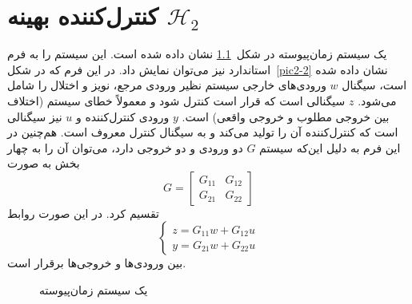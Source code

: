 \chapter{کنترل‌کننده بهینه $\mathcal{H}_2$}

\newcommand{\norm}[1]{\lVert#1\lVert}


یک سیستم زمان‌پیوسته در شکل~\ref{pic2-1} نشان داده شده است. این سیستم را به فرم استاندارد نیز می‌توان نمایش داد. در این فرم که در شکل~\ref{pic2-2} نشان داده شده است، سیگنال $w$ ورودی‌های خارجی سیستم نظیر ورودی مرجع، نویز و اختلال را شامل می‌شود. $z$ سیگنالی است که قرار است کنترل شود و معمولاً خطای سیستم (اختلاف بین خروجی مطلوب و خروجی واقعی) است. $y$ ورودی کنترل‌کننده و $u$ نیز سیگنالی است که کنترل‌کننده آن را تولید می‌کند و به سیگنال کنترل معروف است. هم‌چنین در این فرم به دلیل این‌که سیستم $G$ دو ورودی و دو خروجی دارد، می‌توان آن را به چهار بخش به صورت 
\begin{equation*}
G=
\begin{bmatrix}
G_{11}&G_{12}\\G_{21}&G_{22}
\end{bmatrix} 
\end{equation*}
تقسیم کرد. در این صورت روابط
\begin{equation*}
\left\{\begin{array}{l}
z=G_{11}w+G_{12}u\\
y=G_{21}w+G_{22}u
\end{array}\right. 
\end{equation*}
بین ورودی‌ها و خروجی‌ها برقرار است.

\setlength{\unitlength}{1cm}
\begin{figure}[t]
\centering
{}
\caption{یک سیستم زمان‌پیوسته}
\label{pic2-1}
\end{figure} 

